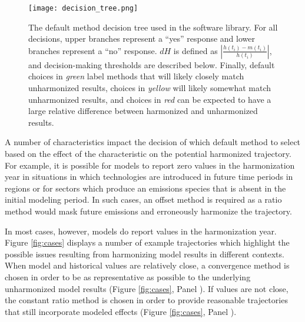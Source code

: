 \begin{figure}
  \begin{center}
    \texttt{[image: decision\_tree.png]}
    \caption[]{
      \label{fig:decision_tree}
      The default method decision tree used in the  software
% 
% 
      library. For all decisions, upper branches represent a ``yes'' response
      and lower branches represent a ``no'' response. $dH$ is defined as
      $\left|\frac{h(t_i) - m(t_i)}{h(t_i)}\right|$, and decision-making
      thresholds are described below. Finally, default choices in \textit{green}
% 
% 
      label methods that will likely closely match unharmonized results, choices
      in \textit{yellow} will likely somewhat match unharmonized results, and
      choices in \textit{red} can be expected to have a large relative
      difference between harmonized and unharmonized results.}
  \end{center}
\end{figure}

A number of characteristics impact the decision of which default method to
select based on the effect of the characteristic on the potential harmonized
trajectory. For example, it is possible for models to report zero values in the
harmonization year in situations in which technologies are introduced in future
time periods in regions or for sectors which produce an emissions species that
is absent in the initial modeling period. In such cases, an offset method is
required as a ratio method would mask future emissions and erroneously harmonize
the trajectory. 

In most cases, however, models do report values in the harmonization
year. Figure \ref{fig:cases} displays a number of example trajectories which
highlight the possible issues resulting from harmonizing model results in
different contexts. When model and historical values are relatively close, a
convergence method is chosen in order to be as representative as possible to the
underlying unharmonized model results (Figure \ref{fig:cases}, Panel
). If values are not close, the constant ratio method is chosen in order
to provide reasonable trajectories that still incorporate modeled effects
(Figure \ref{fig:cases}, Panel ). 

